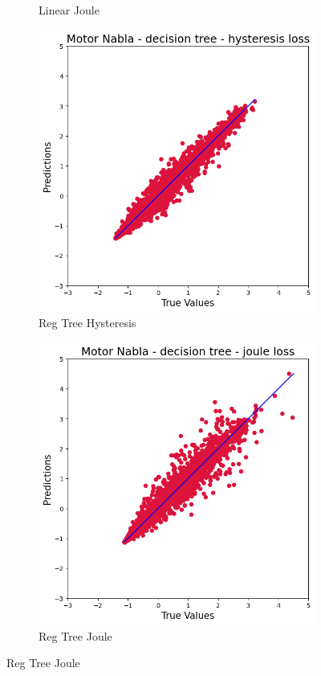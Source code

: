 \documentclass{article}
\begin{document}
\begin{figure}[!htbp]
\begin{subfigure}[b]{0.23\textwidth}
        \caption{Linear Joule}
    \end{subfigure}
    \hfill
    \begin{subfigure}[b]{0.23\textwidth}
        \centering
        \includegraphics[width=\textwidth]{images/Nabla/reg_tree_hysteresis.png}
        \caption{Reg Tree Hysteresis}
    \end{subfigure}
    \hfill
    \begin{subfigure}[b]{0.23\textwidth}
        \centering
        \includegraphics[width=\textwidth]{images/Nabla/reg_tree_joule.png}
        \caption{Reg Tree Joule}
    \end{subfigure}
    

\end{figure}
\end{document}
